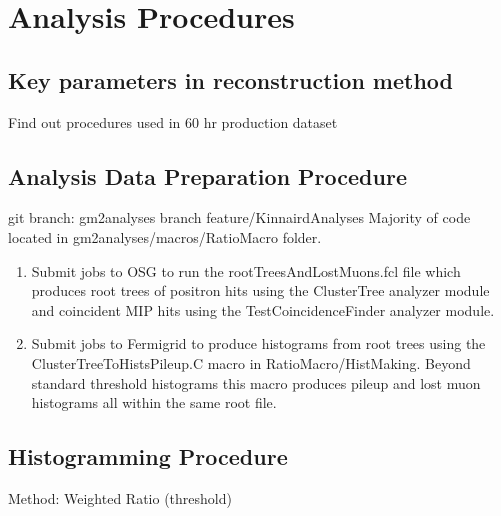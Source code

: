 \chapter{Analysis Procedures}

\section{Key parameters in reconstruction method}

Find out procedures used in 60 hr production dataset

\section{Analysis Data Preparation Procedure}

git branch: gm2analyses branch feature/KinnairdAnalyses
Majority of code located in gm2analyses/macros/RatioMacro folder.

\begin{enumerate}
	\item{Submit jobs to OSG to run the rootTreesAndLostMuons.fcl file which produces root trees of positron hits using the ClusterTree analyzer module and coincident MIP hits using the TestCoincidenceFinder analyzer module.}
	\item{Submit jobs to Fermigrid to produce histograms from root trees using the ClusterTreeToHistsPileup.C macro in RatioMacro/HistMaking. Beyond standard threshold histograms this macro produces pileup and lost muon histograms all within the same root file.}
\end{enumerate}

\section{Histogramming Procedure}

Method: Weighted Ratio (threshold)


